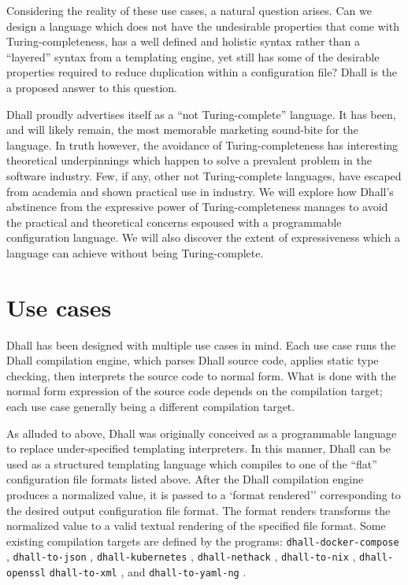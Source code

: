 \documentclass[12pt]{diazessay}
\begin{document}
Considering the reality of these use cases, a natural question arises.
Can we design a language which does not have the undesirable properties that come with Turing-completeness, has a well defined and holistic syntax rather than a ``layered'' syntax from a templating engine, yet still has some of the desirable properties required to reduce duplication within a configuration file? Dhall is the a proposed answer to this question.

Dhall proudly advertises itself as a ``not Turing-complete'' language.
It has been, and will likely remain, the most memorable marketing sound-bite for the language.
In truth however, the avoidance of Turing-completeness has interesting theoretical underpinnings which happen to solve a prevalent problem in the software industry.
Few, if any, other not Turing-complete languages, have escaped from academia and shown practical use in industry.
We will explore how Dhall's abstinence from the expressive power of Turing-completeness manages to avoid the practical and theoretical concerns espoused with a programmable configuration language.
We will also discover the extent of expressiveness which a language can achieve without being Turing-complete.

\section*{Use cases}

Dhall has been designed with multiple use cases in mind.
Each use case runs the Dhall compilation engine, which parses Dhall source code, applies static type checking, then interprets the source code to normal form.
What is done with the normal form expression of the source code depends on the compilation target; each use case generally being a different compilation target.

As alluded to above, Dhall was originally conceived as a programmable language to replace under-specified templating interpreters.
In this manner, Dhall can be used as a structured templating language which compiles to one of the ``flat'' configuration file formats listed above.
After the Dhall compilation engine produces a normalized value, it is passed to a `format rendered'' corresponding to the desired output configuration file format.
The format renders transforms the normalized value to a valid textual rendering of the specified file format.
Some existing compilation targets are defined by the programs: \texttt{dhall-docker-compose} \cite{DhallDocker}, \texttt{dhall-to-json} \cite{DhallJSON}, \texttt{dhall-kubernetes} \cite{DhallKubernetes}, \texttt{dhall-nethack} \cite{DhallNethack}, \texttt{dhall-to-nix} \cite{DhallNix}, \texttt{dhall-openssl} \cite{DhallOpenSSL} \texttt{dhall-to-xml} \cite{DhallXML}, and \texttt{dhall-to-yaml-ng} \cite{DhallYAML}.
\end{document}
